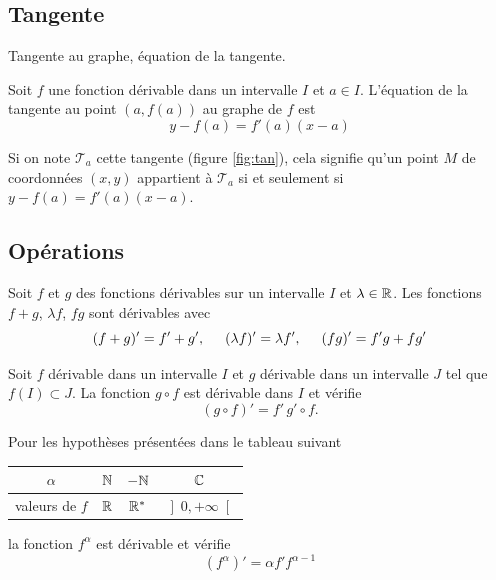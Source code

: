 \subsection{Tangente}
Tangente au graphe, équation de la tangente.
\begin{prop}
 Soit $f$ une fonction dérivable dans un intervalle $I$ et $a\in I$. L'équation de la tangente au point $(a,f(a))$ au graphe de $f$ est
\begin{displaymath}
 y - f(a) = f'(a)(x-a)
\end{displaymath}
\end{prop}
Si on note $\mathcal{T}_a$ cette tangente (figure \ref{fig:tan}), cela signifie qu'un point $M$ de coordonnées $(x,y)$ appartient à $\mathcal{T}_a$ si et seulement si $y-f(a) = f'(a)(x-a)$.

\subsection{Opérations}
\begin{prop}
Soit $f$ et $g$ des fonctions dérivables sur un intervalle $I$ et $\lambda\in \mathbb{R}$. Les fonctions $f+g$, $\lambda f$, $fg$ sont dérivables avec
\begin{displaymath}
 (f+g)' = f' + g',\hspace{0.5cm} (\lambda f)' = \lambda f',\hspace{0.5cm} (fg)' = f'g + f g'
\end{displaymath}
\end{prop}

\begin{prop}[composée]
 Soit $f$ dérivable dans un intervalle $I$ et $g$ dérivable dans un intervalle $J$ tel que $f(I)\subset J$. La fonction $g \circ f$ est dérivable dans $I$ et vérifie
\begin{displaymath}
 (g \circ f)' = f'\, g'\circ f.
\end{displaymath}
\end{prop}

\begin{prop}[puissance]
 Pour les hypothèses présentées dans le tableau suivant
\begin{center}
\renewcommand{\arraystretch}{1.5}
\begin{tabular}{|c|c|c|c|} \hline
$\alpha$       & $\mathbb{N}$ & $-\mathbb{N}$  & $\mathbb{C}$ \\ \hline
valeurs de $f$ & $\mathbb{R}$ & $\mathbb{R}^*$ & $\left] 0, +\infty\right[$ \\ \hline
\end{tabular}
\end{center}
 
 la fonction $f^{\alpha}$ est dérivable et vérifie
\begin{displaymath}
 (f^{\alpha})' = \alpha f' f^{\alpha -1}
\end{displaymath}
\end{prop}


